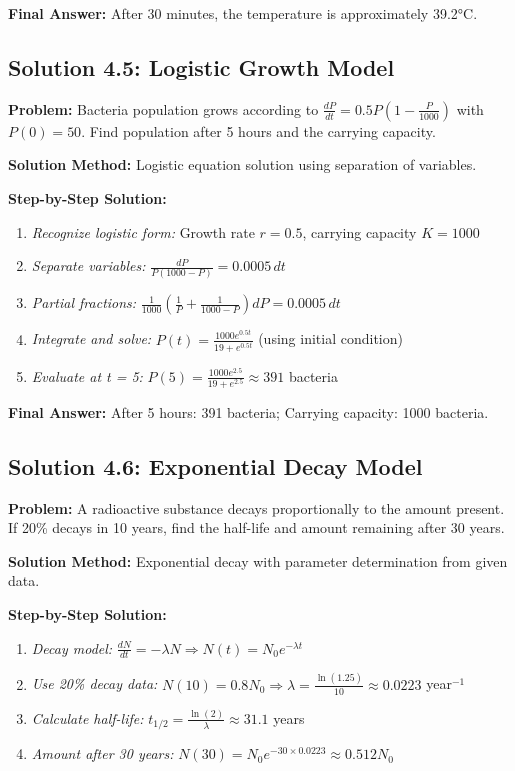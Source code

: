 \documentclass[12pt, letterpaper]{book}
\theoremstyle{problemstyle}
\theoremstyle{solutionstyle}
\begin{document}
\textbf{Final Answer:} After 30 minutes, the temperature is approximately 39.2°C.

\subsection{Solution 4.5: Logistic Growth Model}

\textbf{Problem:} Bacteria population grows according to $\frac{dP}{dt} = 0.5P(1-\frac{P}{1000})$ with $P(0) = 50$. Find population after 5 hours and the carrying capacity.

\textbf{Solution Method:} Logistic equation solution using separation of variables.

\textbf{Step-by-Step Solution:}
\begin{enumerate}
    \item \textit{Recognize logistic form:} Growth rate $r = 0.5$, carrying capacity $K = 1000$
    \item \textit{Separate variables:} $\frac{dP}{P(1000-P)} = 0.0005 \, dt$
    \item \textit{Partial fractions:} $\frac{1}{1000}\left(\frac{1}{P} + \frac{1}{1000-P}\right)dP = 0.0005 \, dt$
    \item \textit{Integrate and solve:} $P(t) = \frac{1000e^{0.5t}}{19 + e^{0.5t}}$ (using initial condition)
    \item \textit{Evaluate at t = 5:} $P(5) = \frac{1000e^{2.5}}{19 + e^{2.5}} \approx 391$ bacteria
\end{enumerate}

\textbf{Final Answer:} After 5 hours: 391 bacteria; Carrying capacity: 1000 bacteria.

\subsection{Solution 4.6: Exponential Decay Model}

\textbf{Problem:} A radioactive substance decays proportionally to the amount present. If 20\% decays in 10 years, find the half-life and amount remaining after 30 years.

\textbf{Solution Method:} Exponential decay with parameter determination from given data.

\textbf{Step-by-Step Solution:}
\begin{enumerate}
    \item \textit{Decay model:} $\frac{dN}{dt} = -\lambda N \Rightarrow N(t) = N_0 e^{-\lambda t}$
    \item \textit{Use 20\% decay data:} $N(10) = 0.8N_0 \Rightarrow \lambda = \frac{\ln(1.25)}{10} \approx 0.0223$ year$^{-1}$
    \item \textit{Calculate half-life:} $t_{1/2} = \frac{\ln(2)}{\lambda} \approx 31.1$ years
    \item \textit{Amount after 30 years:} $N(30) = N_0 e^{-30 \times 0.0223} \approx 0.512N_0$
\end{enumerate}
\end{document}
